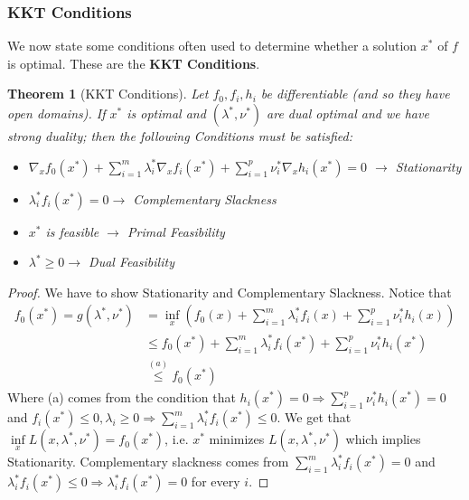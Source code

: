 \documentclass[]{article}
\theoremstyle{mattstyle}
\newtheorem{theorem}{Theorem}[section]
\theoremstyle{definition}
\begin{document}
\newpage

\subsubsection{KKT Conditions}

We now state some conditions often used to determine whether a solution $x^*$ of $f$ is optimal. These are the \textbf{KKT Conditions}.

\begin{theorem}[KKT Conditions]
	Let $f_0, f_i, h_i$ be differentiable (and so they have open domains). If $x^*$ is optimal and $(\lambda^*, \nu^*)$ are dual optimal and we have strong duality; then the following Conditions must be satisfied:
	\begin{itemize}
		\item $\nabla_x f_0(x^*) + \sum_{i=1}^m \lambda_i^* \nabla_x f_i(x^*) + \sum_{i=1}^p \nu_i^* \nabla_x h_i(x^*) = 0$ $\rightarrow$ Stationarity
		\item $\lambda_i^* f_i(x^*)=0 \rightarrow$ Complementary Slackness
		\item $x^*$ is feasible $\rightarrow$ Primal Feasibility
		\item $\lambda^* \ge 0 \rightarrow$ Dual Feasibility
	\end{itemize}
\end{theorem}
\begin{proof}
	We have to show Stationarity and Complementary Slackness. Notice that
	\begin{align}
	f_{0}(x^*) = g(\lambda^*, \nu^*) &= \inf_x \left( f_0(x) + \sum_{i=1}^m \lambda_i^*f_i(x) + \sum_{i=1}^p \nu_i^* h_i(x) \right) \\
	&\le f_0(x^*) + \sum_{i=1}^m \lambda_i^*f_i(x^*) + \sum_{i=1}^p \nu_i^* h_i(x^*)\\
	&\overset{(a)}{\le} f_0(x^*)
	\end{align}
	Where (a) comes from the condition that $h_i(x^*) = 0 \Rightarrow \sum_{i=1}^p \nu_i^* h_i(x^*) = 0$ and $f_i(x^*) \le 0, \lambda_i \ge 0 \Rightarrow \sum_{i=1}^m \lambda_i^* f_i(x^*) \le 0$. We get that $\inf\limits_{x} L(x, \lambda^*, \nu^*) = f_0(x^*)$, i.e. $x^*$ minimizes $L(x, \lambda^*, \nu^*)$ which implies Stationarity. Complementary slackness comes from $\sum_{i=1}^m \lambda_i^* f_i(x^*) = 0$ and $\lambda_i^* f_i(x^*) \le 0 \Rightarrow \lambda_i^* f_i(x^*) = 0$ for every $i$.
\end{proof}
\end{document}
